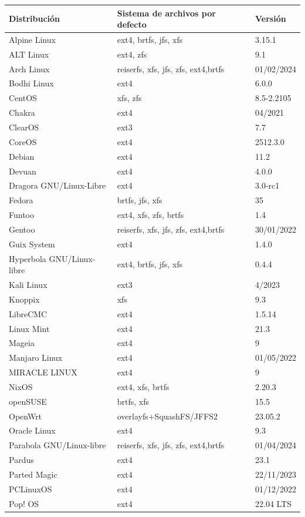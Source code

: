 \documentclass[12pt, a4paper]{book}
\begin{document}
\begin{longtable}{|l|l|l|}
\hline
\textbf{Distribución} & \textbf{Sistema de archivos por defecto} & \textbf{Versión} \\
\hline
Alpine Linux & ext4, brtfs, jfs, xfs & 3.15.1 \\
ALT Linux & ext4, zfs & 9.1 \\
Arch Linux & reiserfs, xfs, jfs, zfs, ext4,brtfs & 01/02/2024 \\
Bodhi Linux & ext4 & 6.0.0 \\
CentOS & xfs, zfs & 8.5-2.2105 \\
Chakra & ext4 & 04/2021 \\
ClearOS & ext3 & 7.7 \\
CoreOS & ext4 & 2512.3.0 \\
Debian & ext4 & 11.2 \\
Devuan & ext4 & 4.0.0 \\
Dragora GNU/Linux-Libre & ext4 & 3.0-rc1 \\
Fedora & brtfs, jfs, xfs & 35 \\
Funtoo & ext4, xfs, zfs, brtfs & 1.4 \\
Gentoo & reiserfs, xfs, jfs, zfs, ext4,brtfs & 30/01/2022 \\
Guix System & ext4 & 1.4.0 \\
Hyperbola GNU/Linux-libre & ext4, brtfs, jfs, xfs & 0.4.4 \\
Kali Linux & ext3 & 4/2023 \\
Knoppix & xfs & 9.3 \\
LibreCMC & ext4 & 1.5.14 \\
Linux Mint & ext4 & 21.3 \\
Mageia & ext4 & 9 \\
Manjaro Linux & ext4 & 01/05/2022 \\
MIRACLE LINUX & ext4 & 9 \\
NixOS & ext4, xfs, brtfs & 2.20.3 \\
openSUSE & brtfs, xfs & 15.5 \\
OpenWrt & overlayfs+SquashFS/JFFS2 & 23.05.2 \\
Oracle Linux & ext4 & 9.3 \\
Parabola GNU/Linux-libre & reiserfs, xfs, jfs, zfs, ext4,brtfs & 01/04/2024 \\
Pardus & ext4 & 23.1 \\
Parted Magic & ext4 & 22/11/2023 \\
PCLinuxOS & ext4 & 01/12/2022 \\
Pop! OS & ext4 & 22.04 LTS \\

\end{longtable}
\end{document}
